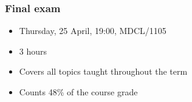 % 
% 	
% 
% 	
% 
% 	
% 
% 	
% 

\begin{frame}\frametitle{Final exam}
	\begin{itemize}
		\item	Thursday, 25 April, 19:00, MDCL/1105 {\color{myOrange}{(please confirm)}}
		\item	3 hours 
		\item	Covers all topics taught throughout the term
		\item	Counts 48\% of the course grade
	\end{itemize}
\end{frame}

